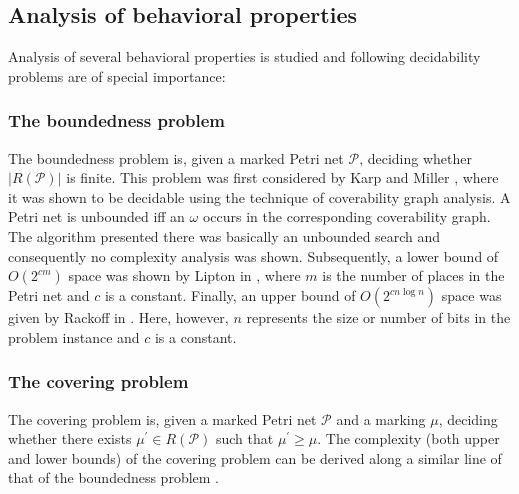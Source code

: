 \subsection{Analysis of behavioral properties} %
\label{sub:analysis_of_behavioral_properties}

Analysis of several behavioral properties is studied and following decidability problems are of special importance:

\subsubsection{The boundedness problem} %
\label{ssub:the_boundedness_problem}
  The  boundedness problem is, given a marked Petri net $\mathcal P$, deciding whether $|R(\mathcal P)|$ is finite. This problem was first considered by Karp and Miller \cite{Karp69ParallelProgramSchemata}, where it was shown to be decidable using the technique of coverability graph analysis. A Petri net is unbounded iff an $\omega$ occurs in the corresponding coverability graph. The algorithm presented there was basically an unbounded search and consequently no complexity analysis was shown. Subsequently, a lower bound of $O(2^{cm})$ space was shown by Lipton in \cite{Lipton76Reachability}, where $m$ is the number of places in the Petri net and $c$ is a constant. Finally, an upper bound of $O(2^{cn\log{n}})$ space was given by Rackoff in \cite{Rackoff78Reachability}. Here, however, $n$ represents the size or number of bits in the problem instance and $c$ is a constant.

\subsubsection{The covering problem} %
\label{ssub:the_covering_problem}
  The covering problem is, given a marked Petri net $\mathcal P$ and a marking $\mu$, deciding whether there exists $\mu^\prime\in R(\mathcal P)$ such that $\mu^\prime\geq\mu$. The complexity (both upper and lower bounds) of the covering problem can be derived along a similar line of that of the boundedness problem \cite{Rackoff78Reachability}.

